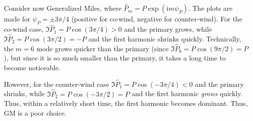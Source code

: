 \documentclass{jfm}
\newcommand{\GenP}{\hat{P}_m}
\newcommand{\POne}{\hat{P}_1}
\newcommand{\PTwo}{\hat{P}_2}
\newcommand{\im}{\mathrm{i}}
\begin{document}
Consider now Generalized Miles, where $\GenP = P \exp(\im m \psi_P)$.
The plots are made for $\psi_P = \pm 3\pi/4$ (positive for
co-wind, negative for counter-wind).
For the co-wind case, $\Im{\POne} = P \cos(3\pi/4) > 0$ and the primary
grows, while $\Im{\PTwo} = P \cos(3\pi/2) = -P$ and the first harmonic
shrinks quickly.
Technically, the $m=6$ mode grows quicker than the primary (since
$\Im{\hat{P}_6} = P \cos(9\pi/2) = P$), but since it is so much smaller
than the primary, it takes a long time to become noticeable.

However, for the counter-wind case $\Im{\POne} = P \cos(-3\pi/4) < 0$ and the primary
shrinks, while $\Im{\PTwo} = P \cos(-3\pi/2) = P$ and the first harmonic
\emph{grows} quickly.
Thus, within a relatively short time, the first harmonic becomes
dominant.
Thus, GM is a poor choice.

\appendix
\end{document}
